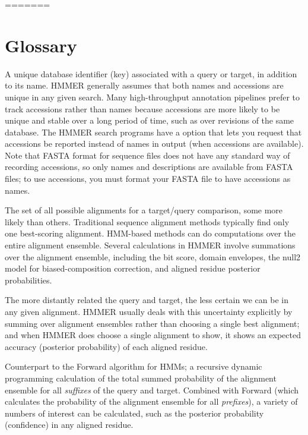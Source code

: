 =======

\section{Glossary}
\setcounter{footnote}{0}

\begin{wideitem}

\item[\textbf{accession}] A unique database identifier (key)
  associated with a query or target, in addition to its name. HMMER
  generally assumes that both names and accessions are unique in any
  given search. Many high-throughput annotation pipelines prefer to
  track accessions rather than names because accessions are more
  likely to be unique and stable over a long period of time, such as
  over revisions of the same database. The HMMER search programs have
  a  option that lets you request that accessions be
  reported instead of names in output (when accessions are
  available). Note that FASTA format for sequence files does not have
  any standard way of recording accessions, so only names and
  descriptions are available from FASTA files; to use accessions, you
  must format your FASTA file to have accessions as names.

\item[\textbf{alignment ensemble}] The set of all possible alignments
  for a target/query comparison, some more likely than others.
  Traditional sequence alignment methods typically find only one
  best-scoring alignment. HMM-based methods can do computations over
  the entire alignment ensemble. Several calculations in HMMER involve
  summations over the alignment ensemble, including the bit score,
  domain envelopes, the null2 model for biased-composition correction,
  and aligned residue posterior probabilities.

\item[\textbf{alignment uncertainty}] The more distantly related the
  query and target, the less certain we can be in any given
  alignment. HMMER usually deals with this uncertainty explicitly by
  summing over alignment ensembles rather than choosing a single best
  alignment; and when HMMER does choose a single alignment to show, it
  shows an expected accuracy (posterior probability) of each aligned
  residue.

\item[\textbf{Backward algorithm}] Counterpart to the Forward
  algorithm for HMMs; a recursive dynamic programming calculation of
  the total summed probability of the alignment ensemble for all
  \emph{suffixes} of the query and target. Combined with Forward
  (which calculates the probability of the alignment ensemble for all
  \emph{prefixes}), a variety of numbers of interest can be
  calculated, such as the posterior probability (confidence) in any
  aligned residue.


\end{wideitem}
